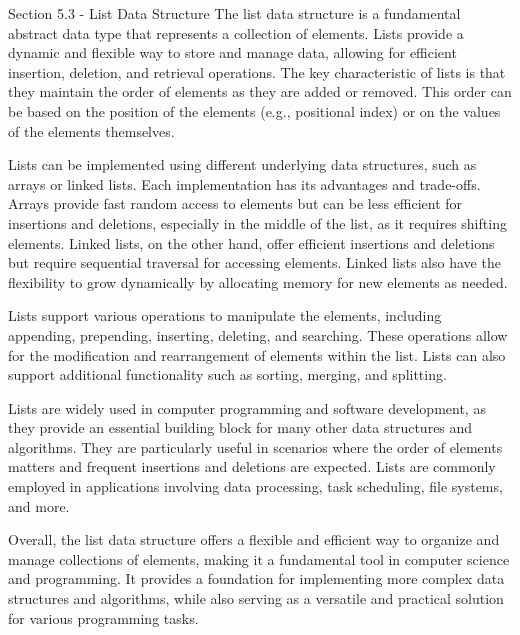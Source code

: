 \begin{notes}{Section 5.3 - List Data Structure}
    The list data structure is a fundamental abstract data type that represents a collection of elements. Lists provide a dynamic and flexible way to store and manage data, allowing for efficient insertion, deletion, and retrieval operations. 
    The key characteristic of lists is that they maintain the order of elements as they are added or removed. This order can be based on the position of the elements (e.g., positional index) or on the values of the elements themselves.
    
    Lists can be implemented using different underlying data structures, such as arrays or linked lists. Each implementation has its advantages and trade-offs. Arrays provide fast random access to elements but can be less efficient for insertions 
    and deletions, especially in the middle of the list, as it requires shifting elements. Linked lists, on the other hand, offer efficient insertions and deletions but require sequential traversal for accessing elements. Linked lists also have 
    the flexibility to grow dynamically by allocating memory for new elements as needed.
    
    Lists support various operations to manipulate the elements, including appending, prepending, inserting, deleting, and searching. These operations allow for the modification and rearrangement of elements within the list. Lists can also support 
    additional functionality such as sorting, merging, and splitting.
    
    Lists are widely used in computer programming and software development, as they provide an essential building block for many other data structures and algorithms. They are particularly useful in scenarios where the order of elements matters and 
    frequent insertions and deletions are expected. Lists are commonly employed in applications involving data processing, task scheduling, file systems, and more.
    
    Overall, the list data structure offers a flexible and efficient way to organize and manage collections of elements, making it a fundamental tool in computer science and programming. It provides a foundation for implementing more complex data 
    structures and algorithms, while also serving as a versatile and practical solution for various programming tasks.
\end{notes}

